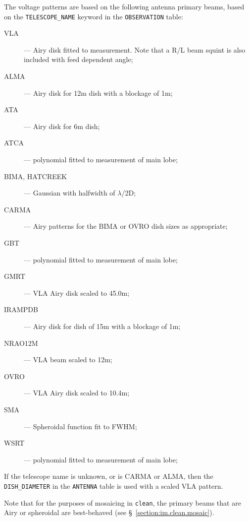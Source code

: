 The voltage patterns are based on the following antenna primary beams,
based on the {\tt TELESCOPE\_NAME} keyword in the {\tt OBSERVATION}
table:
\begin{description}
\item[VLA] --- Airy disk fitted to measurement. Note that a R/L beam
squint is also included with feed dependent angle;

\item[ALMA] --- Airy disk for 12m dish with a blockage of 1m;

\item[ATA] --- Airy disk for 6m dish;

\item[ATCA] --- polynomial fitted to measurement of main lobe;

\item[BIMA, HATCREEK] --- Gaussian with halfwidth of $\lambda$/2D;

\item[CARMA] --- Airy patterns for the BIMA or OVRO dish sizes as appropriate;

\item[GBT] --- polynomial fitted to measurement of main lobe;

\item[GMRT] --- VLA Airy disk scaled to 45.0m;

\item[IRAMPDB] --- Airy disk for dish of 15m with a blockage of 1m;

\item[NRAO12M] ---  VLA beam scaled to 12m;

\item[OVRO] --- VLA Airy disk scaled to 10.4m;

\item[SMA] --- Spheroidal function fit to FWHM;

\item[WSRT] --- polynomial fitted to measurement of main lobe;

\end{description}

If the telescope name is unknown, or is CARMA or ALMA, then the
{\tt DISH\_DIAMETER} in the {\tt ANTENNA} table is used with a
scaled VLA pattern.


Note that for the purposes of mosaicing in {\tt clean}, the primary
beams that are Airy or spheroidal are best-behaved 
(see \S~\ref{section:im.clean.mosaic}).

